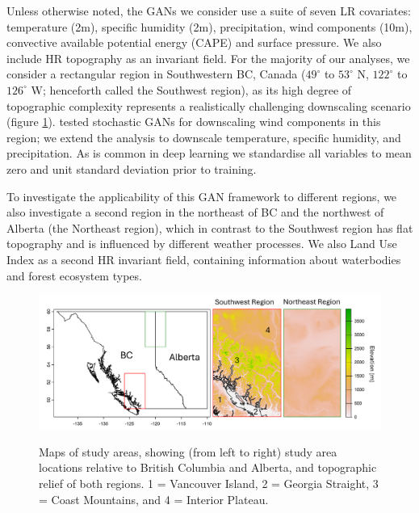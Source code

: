 \documentclass{ametsocV6.1}
\begin{document}
Unless otherwise noted, the GANs we consider use a suite of seven LR covariates: temperature (2m), specific humidity (2m), precipitation, wind components (10m), convective available potential energy (CAPE) and surface pressure. We also include HR topography as an invariant field. For the majority of our analyses, we consider a rectangular region in Southwestern BC, Canada ($49^\circ$ to $53^\circ$ N, $122^\circ$ to $126^\circ$ W; henceforth called the Southwest region), as its high degree of topographic complexity represents a realistically challenging downscaling scenario (figure \ref{studyarea}). \citet{daust2024capturing} tested stochastic GANs for downscaling wind components in this region; we extend the analysis to downscale temperature, specific humidity, and precipitation. As is common in deep learning we standardise all variables to mean zero and unit standard deviation prior to training. 

To investigate the applicability of this GAN framework to different regions, we also investigate a second region in the northeast of BC and the northwest of Alberta (the Northeast region), which in contrast to the Southwest region has flat topography and is influenced by different weather processes. We also Land Use Index as a second HR invariant field, containing information about waterbodies and forest ecosystem types. 

\begin{figure}[H]
  \noindent\includegraphics[width=\textwidth,angle=0]{final/StudyAreas.png}\\
  \caption{Maps of study areas, showing (from left to right) study area locations relative to British Columbia and Alberta, and topographic relief of both regions. 1 = Vancouver Island, 2 = Georgia Straight, 3 = Coast Mountains, and 4 = Interior Plateau.}\label{studyarea}
\end{figure}
\end{document}
